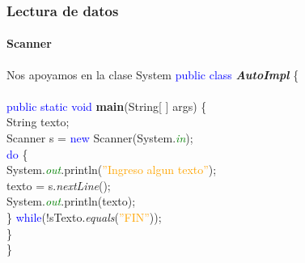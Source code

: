 \documentclass{beamer}
\begin{document}
        \begin{frame}
			\frametitle{Lectura de datos}
			\framesubtitle{Scanner}

            \begin{block}{Nos apoyamos en la clase System}
				{\scriptsize
				\textcolor{blue}{public class} \textbf{\emph{AutoImpl}} \{ \\
				\hspace{1cm} \\
				\hspace{1cm} \textcolor{blue}{public static void} \textbf{main}(String[ ] args) \{ \\
				\hspace{2cm} String texto; \\
				\hspace{2cm} Scanner s = \textcolor{blue}{new} Scanner(System.\textcolor{green}{\emph{in}});\\
				\hspace{2cm} \textcolor{blue}{do} \{ \\
				\hspace{3cm} System.\emph{\textcolor{green}{out}}.println(\textcolor{orange}{''Ingreso algun texto''});\\
				\hspace{3cm} texto = s.\emph{nextLine}();\\
				\hspace{3cm} System.\emph{\textcolor{green}{out}}.println(texto);\\
				\hspace{2cm} \} \textcolor{blue}{while}(!sTexto.\emph{equals}(\textcolor{orange}{''FIN''})); \\
				\hspace{1cm} \} \\
				\}}
			\end{block}
		\end{frame}	
\end{document}

